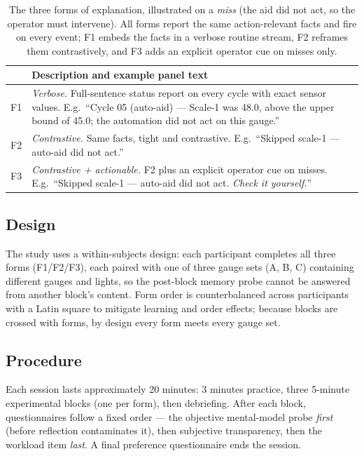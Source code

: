\documentclass[10pt,twocolumn]{article}
\begin{document}
\begin{table}[htbp]
\centering
\caption{The three forms of explanation, illustrated on a \textit{miss} (the aid did not act, so the operator must intervene). All forms report the same action-relevant facts and fire on every event; F1 embeds the facts in a verbose routine stream, F2 reframes them contrastively, and F3 adds an explicit operator cue on misses only.}
\label{tab:forms}
\begin{tabular}{@{}p{}p{}@{}}
\toprule
 & Description and example panel text \\ \midrule
F1 & \textit{Verbose.} Full-sentence status report on every cycle with exact sensor values. E.g.\ ``Cycle 05 (auto-aid) --- Scale-1 was 48.0, above the upper bound of 45.0; the automation did not act on this gauge.'' \\[4pt]
F2 & \textit{Contrastive.} Same facts, tight and contrastive. E.g.\ ``Skipped scale-1 --- auto-aid did not act.'' \\[4pt]
F3 & \textit{Contrastive + actionable.} F2 plus an explicit operator cue on misses. E.g.\ ``Skipped scale-1 --- auto-aid did not act. \textit{Check it yourself.}'' \\ \bottomrule
\end{tabular}
\end{table}

\subsection{Design}
The study uses a within-subjects design: each participant completes all three forms (F1/F2/F3), each paired with one of three gauge sets (A, B, C) containing different gauges and lights, so the post-block memory probe cannot be answered from another block's content. Form order is counterbalanced across participants with a Latin square to mitigate learning and order effects; because blocks are crossed with forms, by design every form meets every gauge set.

\subsection{Procedure}
Each session lasts approximately 20 minutes: 3 minutes practice, three 5-minute experimental blocks (one per form), then debriefing. After each block, questionnaires follow a fixed order --- the objective mental-model probe \textit{first} (before reflection contaminates it), then subjective transparency, then the workload item \textit{last}. A final preference questionnaire ends the session.
\end{document}
